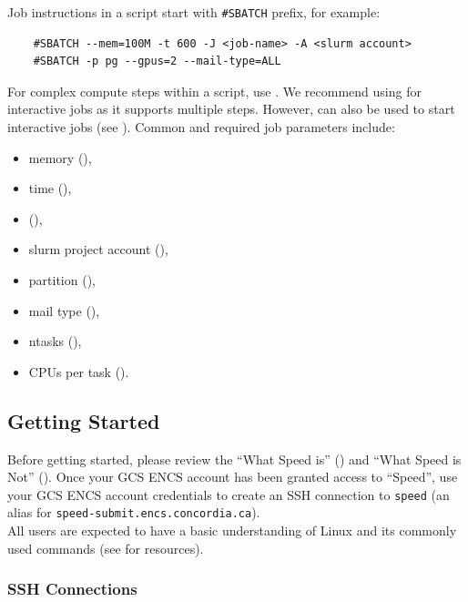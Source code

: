 \documentclass{easychair}
\begin{document}
\noindent Job instructions in a script start with \verb+#SBATCH+ prefix, for example:
\begin{verbatim}
    #SBATCH --mem=100M -t 600 -J <job-name> -A <slurm account>
    #SBATCH -p pg --gpus=2 --mail-type=ALL
\end{verbatim}
%
For complex compute steps within a script, use . We recommend using  for interactive jobs as it supports multiple steps.
However,  can also be used to start interactive jobs (see ).
%
Common and required job parameters include:
%
\begin{multicols}{2}
\begin{itemize}
	\item 
memory (),
	\item 
time (),
	\item 
{} (),
	\item 
slurm project account (),
	\item 
partition (), 
	\item 
mail type (),
	\item 
ntasks (),
	\item 
CPUs per task ().
\end{itemize}
\end{multicols}

\subsection{Getting Started}
\label{sect:getting-started}

Before getting started, please review the ``What Speed is'' ()
and ``What Speed is Not'' ().
Once your GCS ENCS account has been granted access to ``Speed'',
use your GCS ENCS account credentials to create an SSH connection to 
\texttt{speed} (an alias for \texttt{speed-submit.encs.concordia.ca}).\\

All users are expected to have a basic understanding of
Linux and its commonly used commands (see  for resources).

\subsubsection{SSH Connections}
\label{sect:ssh}
\end{document}

